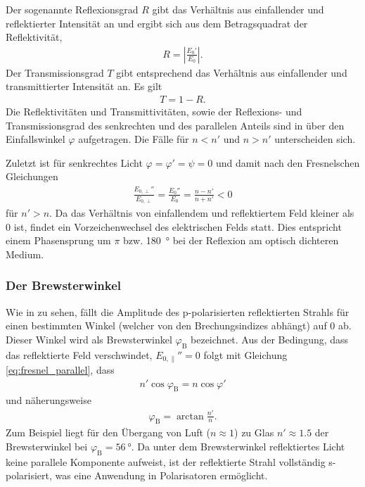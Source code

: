 Der sogenannte Reflexionsgrad $R$ gibt das Verhältnis aus einfallender und reflektierter Intensität an und ergibt sich aus dem Betragsquadrat der Reflektivität,
\begin{align*}
    R=\left| \frac{E_0'}{E_0} \right|.
\end{align*}
Der Transmissionsgrad $T$ gibt entsprechend das Verhältnis aus einfallender und transmittierter Intensität an. Es gilt
\begin{align*}
    T=1-R.
\end{align*}
Die Reflektivitäten und Transmittivitäten, sowie der Reflexions- und Transmissionsgrad des senkrechten und des parallelen Anteils sind in 
über den Einfallswinkel $\varphi$ aufgetragen. Die Fälle für $n<n'$ und $n>n'$ unterscheiden sich.

Zuletzt ist für senkrechtes Licht $\varphi=\varphi'=\psi=0$ und damit nach den Fresnelschen Gleichungen
\begin{align*}
    \frac{E_{0,\perp}''}{E_{0,\perp}}=\frac{E_{0}''}{E_{0}} = \frac{n-n'}{n+n'} < 0
\end{align*}
für $n'>n$. Da das Verhältnis von einfallendem und reflektiertem Feld kleiner als $0$ ist, findet ein Vorzeichenwechsel des elektrischen Felds statt.
Dies entspricht einem Phasensprung um $\pi$ bzw. \SI{180}{\degree} bei der Reflexion am optisch dichteren Medium.


\subsubsection{Der Brewsterwinkel}

Wie in  zu sehen, fällt die Amplitude des p-polarisierten reflektierten Strahls für einen bestimmten Winkel (welcher von den Brechungsindizes abhängt) auf $0$ ab.
Dieser Winkel wird als Brewsterwinkel $\varphi_\mathrm{B}$ bezeichnet. Aus der Bedingung, dass das reflektierte Feld verschwindet, $E_{0,\parallel}''=0$ folgt mit Gleichung \eqref{eq:fresnel_parallel}, dass
\begin{align*}
    n' \cos\varphi_\mathrm{B} = n \cos\varphi'
\end{align*}
und näherungsweise
\begin{align}
    \label{eq:brewsterwinkel}
    \varphi_\mathrm{B} = \arctan\frac{n'}{n}.
\end{align}
Zum Beispiel liegt für den Übergang von Luft ($n\approx 1$) zu Glas $n'\approx \num{1,5}$ der Brewsterwinkel bei $\varphi_\mathrm{B}=\SI{56}{\degree}$.
Da unter dem Brewsterwinkel reflektiertes Licht keine parallele Komponente aufweist, ist der reflektierte Strahl vollständig s-polarisiert, was eine Anwendung in Polarisatoren ermöglicht.



